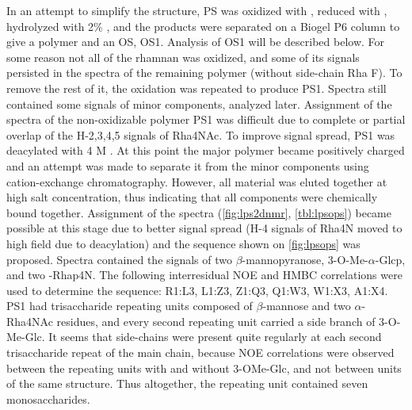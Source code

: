 		In an attempt to simplify the structure, \ac{PS} was oxidized with , reduced with , hydrolyzed with 2\% , and the products were separated on a Biogel P6 column to give a polymer and an \ac{OS}, \ac{OS}1. Analysis of \ac{OS}1 will be described below. For some reason not all of the rhamnan was oxidized, and some of its signals persisted in the spectra of the remaining polymer (without side-chain Rha F). To remove the rest of it, the oxidation was repeated to produce \ac{PS}1. Spectra still contained some signals of minor components, analyzed later. Assignment of the spectra of the non-oxidizable polymer \ac{PS}1 was difficult due to complete or partial overlap of the H-2,3,4,5 signals of Rha4NAc. To improve signal spread, \ac{PS}1 was deacylated with 4 M . At this point the major polymer became positively charged and an attempt was made to separate it from the minor components using cation-exchange chromatography. However, all material was eluted together at high salt concentration, thus indicating that all components were chemically bound together. Assignment of the spectra (\cref{fig:lps2dnmr}, \cref{tbl:lpsops}) became possible at this stage due to better signal spread (H-4 signals of Rha4N moved to high field due to deacylation) and the sequence shown on \cref{fig:lpsops} was proposed. Spectra contained the signals of two $\beta$-mannopyranose, 3-O-Me-$\alpha$-Glcp, and two -Rhap4N. The following interresidual \ac{NOE} and \ac{HMBC} correlations were used to determine the sequence: R1:L3, L1:Z3, Z1:Q3, Q1:W3, W1:X3, A1:X4. \ac{PS}1 had trisaccharide repeating units composed of $\beta$-mannose and two $\alpha$-Rha4NAc residues, and every second repeating unit carried a side branch of 3-O-Me-Glc. It seems that side-chains were present quite regularly at each second trisaccharide repeat of the main chain, because \ac{NOE} correlations were observed between the repeating units with and without 3-OMe-Glc, and not between units of the same structure. Thus altogether, the repeating unit contained seven monosaccharides.

